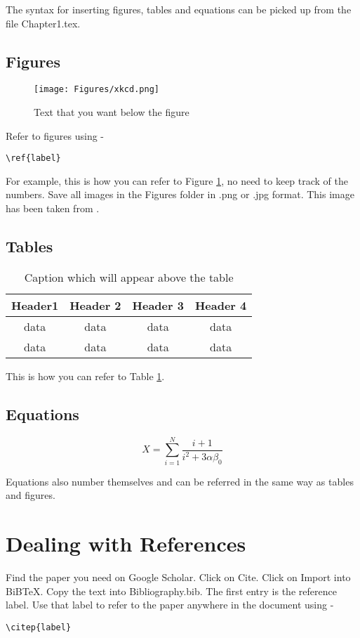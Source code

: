 The syntax for inserting figures, tables and equations can be picked up from the file Chapter1.tex.

\subsection{Figures}

\begin{figure}
\centering
\texttt{[image: Figures/xkcd.png]}
\caption[Text that you want on the list of figures page]{Text that you want below the figure}
\label{fig:nameForThisFigure}
\end{figure}

Refer to figures using - \begin{verbatim}\ref{label} \end{verbatim} For example, this is how you can refer to Figure \ref{fig:nameForThisFigure}, no need to keep track of the numbers. Save all images in the Figures folder in .png or .jpg format. This image has been taken from \citep{xkcd}.

\subsection{Tables}

\begin{table}
\centering
\caption[Text that you want on the list of tables page]{Caption which will appear above the table}

\begin{tabular}{c|c|c|c}
Header1 & Header 2 & Header 3 & Header 4 \\ \hline
data & data & data & data \\
data & data & data & data \\ \hline
\end{tabular}

\label{tab:nameForThisTable}
\end{table}
 
This is how you can refer to Table \ref{tab:nameForThisTable}.

\subsection{Equations}

\begin{equation}
X = \sum_{i=1}^{N}{\frac{i+1}{i^2 + 3\alpha\beta_0}}
\label{eqn: equationLabel}
\end{equation}

Equations also number themselves and can be referred in the same way as tables and figures.

\section{Dealing with References}

Find the paper you need on Google Scholar. Click on Cite. Click on Import into BiBTeX. Copy the text into Bibliography.bib. The first entry is the reference label. Use that label to refer to the paper anywhere in the document using - 
\begin{verbatim}
\citep{label}
\end{verbatim}